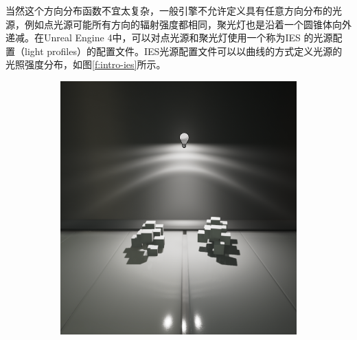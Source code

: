 当然这个方向分布函数不宜太复杂，一般引擎不允许定义具有任意方向分布的光源，例如点光源可能所有方向的辐射强度都相同，聚光灯也是沿着一个圆锥体向外递减。在Unreal Engine 4中，可以对点光源和聚光灯使用一个称为IES\cite{m:IESLightProfiles} 的光源配置（light profiles）的配置文件。IES光源配置文件可以以曲线的方式定义光源的光照强度分布，如图\ref{f:intro-ies}所示。

\begin{figure}
\begin{fullwidth}
	\begin{subfigure}[b]{0.209\thewidth}
		\includegraphics[width=1.\textwidth]{figures/intro/IES_01}
	\end{subfigure}
	\begin{subfigure}[b]{0.213\thewidth}

\end{subfigure}
\end{fullwidth}
\end{figure}
